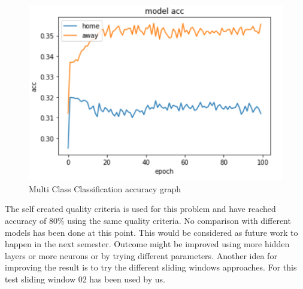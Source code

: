 \begin{figure}[H]
\begin{center}
\includegraphics[scale=1.5]{images/mccacc.PNG}
\end{center}
\caption{Multi Class Classification accuracy graph}
\label{mccacc}
\end{figure}

The self created quality criteria is used for this problem and have reached accuracy of 80\% using the same quality criteria. No comparison with different models has been done at this point. This would be considered as future work to happen in the next semester. Outcome might be improved using more hidden layers or more neurons or by trying different parameters. Another idea for improving the result is to try the different sliding windows approaches. For this test sliding window 02 has been used by us. 


